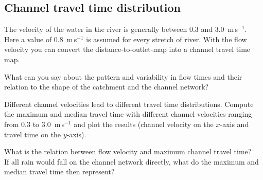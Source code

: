 \documentclass[twocolumn, 10pt, a4paper]{article}
\newenvironment{PC_prac_environment}{
\def\Q{\noindent \color{Gray}\rule[-0.1cm]{\columnwidth}{1.5pt}  \color{black} } \let\ques\Q 
\def\nQ{\noindent \color{black} } \let\ques\nQ 
\def\E{\color{Gray}\rule[0.3cm]{\columnwidth}{1.5pt} \color{black}} \let\ques\E }
\newcommand{\A}[2] { \ifthenelse{\boolean{showanswer}} {\noindent \color{cyan}{#2}\color{black}} {\multido{}{#1}{\noindent \color{light-gray}\hrulefill\\} } }
\begin{document}
\begin{PC_prac_environment}
\subsection{Channel travel time distribution}
The velocity of the water in the river is generally between 0.3 and 3.0~m\,s$^{-1}$. Here a value of 0.8~m\,s$^{-1}$ is assumed for every stretch of river. With the flow velocity you can convert the distance-to-outlet-map into a channel travel time map. 

\Q What can you say about the pattern and variability in flow times and their relation to the shape of the catchment and the channel network?\\
\E

Different channel velocities lead to different travel time distributions. Compute the maximum and median travel time with different channel velocities ranging from $0.3$ to 3.0~m\,s$^{-1}$ and plot the results (channel velocity on the $x$-axis and travel time on the $y$-axis).

\Q What is the relation between flow velocity and maximum channel travel time?\\
\nQ If all rain would fall on the channel network directly, what do the maximum and median travel time then represent?\\
\E


\end{PC_prac_environment}
\end{document}
